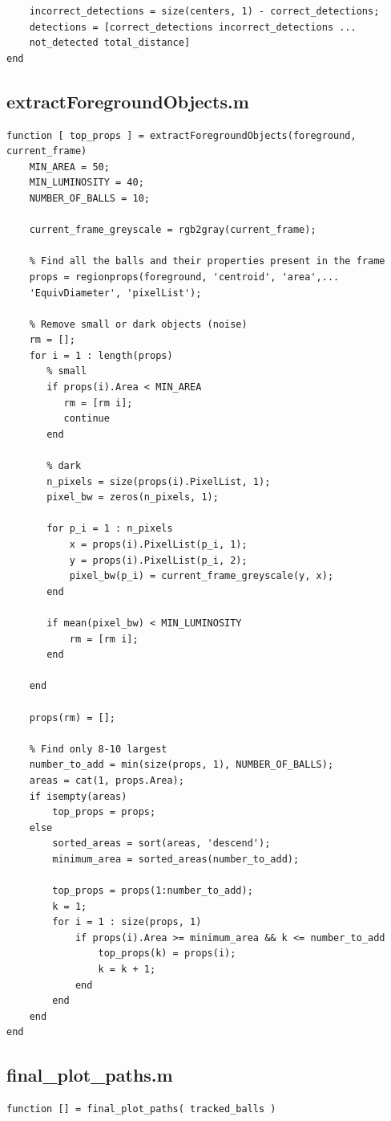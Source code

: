 \documentclass[12pt,a4paper]{article}
\begin{document}
\begin{appendices}
\begin{verbatim}
    incorrect_detections = size(centers, 1) - correct_detections;
    detections = [correct_detections incorrect_detections ...
    not_detected total_distance]
end
\end{verbatim}

\subsection{extractForegroundObjects.m}
\begin{verbatim}
function [ top_props ] = extractForegroundObjects(foreground, current_frame)
    MIN_AREA = 50;
    MIN_LUMINOSITY = 40;
    NUMBER_OF_BALLS = 10;
    
    current_frame_greyscale = rgb2gray(current_frame);
    
    % Find all the balls and their properties present in the frame
    props = regionprops(foreground, 'centroid', 'area',...
    'EquivDiameter', 'pixelList');
    
    % Remove small or dark objects (noise)
    rm = [];
    for i = 1 : length(props)
       % small
       if props(i).Area < MIN_AREA
          rm = [rm i];
          continue
       end
       
       % dark
       n_pixels = size(props(i).PixelList, 1);
       pixel_bw = zeros(n_pixels, 1);
       
       for p_i = 1 : n_pixels
           x = props(i).PixelList(p_i, 1);
           y = props(i).PixelList(p_i, 2);
           pixel_bw(p_i) = current_frame_greyscale(y, x);
       end
       
       if mean(pixel_bw) < MIN_LUMINOSITY
           rm = [rm i];
       end
       
    end
    
    props(rm) = [];
    
    % Find only 8-10 largest
    number_to_add = min(size(props, 1), NUMBER_OF_BALLS); 
    areas = cat(1, props.Area);
    if isempty(areas)
        top_props = props;
    else
        sorted_areas = sort(areas, 'descend');
        minimum_area = sorted_areas(number_to_add);
    
        top_props = props(1:number_to_add);
        k = 1;
        for i = 1 : size(props, 1)
            if props(i).Area >= minimum_area && k <= number_to_add
                top_props(k) = props(i);
                k = k + 1;
            end
        end
    end
end
\end{verbatim}

\subsection{final\_plot\_paths.m}
\begin{verbatim}
function [] = final_plot_paths( tracked_balls )


\end{verbatim}
\end{appendices}
\end{document}
